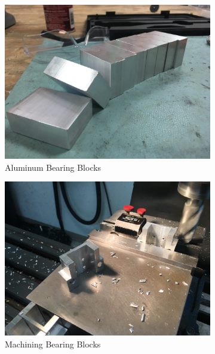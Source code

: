 \documentclass{article}
\begin{document}
\begin{figure}[h!]
\centering
\begin{subfigure}{.45\textwidth}
  \centering
  \includegraphics[width=\textwidth]{25_02-18/images/Blocks.jpg}
  \caption{Aluminum Bearing Blocks}
  \label{fig:Blocks}
 \end{subfigure}
\begin{subfigure}{.45\textwidth}
  \centering
 \includegraphics[width=\textwidth]{25_02-18/images/Bearing.jpg}
  \caption{Machining Bearing Blocks}
  \label{fig:Bearing}
  \end{subfigure}
  \begin{subfigure}{.45\textwidth}
  \centering

\end{subfigure}
\end{figure}
\end{document}
